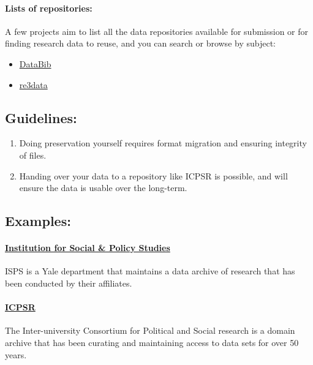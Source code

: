 \documentclass[]{article}
\begin{document}
\paragraph{Lists of repositories:}\label{lists-of-repositories}

A few projects aim to list all the data repositories available for
submission or for finding research data to reuse, and you can search or
browse by subject:  

\begin{itemize}
\itemsep1pt\parskip0pt
\item
\href{http://databib.org/}{DataBib} 
\item
\href{http://www.re3data.org}{re3data}
\end{itemize}

\subsection{Guidelines:}\label{guidelines-2}

\begin{enumerate}
\def\labelenumi{\arabic{enumi}.}
\itemsep1pt\parskip0pt
\item
  Doing preservation yourself requires format migration and ensuring
  integrity of files.
\item
  Handing over your data to a repository like ICPSR is possible, and
  will ensure the data is usable over the long-term.
\end{enumerate}

\subsection{Examples:}\label{examples}

\paragraph{\href{http://isps.yale.edu/research\#.UwJU7IVnCSo}{Institution
for Social \& Policy
Studies}}\label{institution-for-social-policy-studies}

ISPS is a Yale department that maintains a data archive of research that
has been conducted by their affiliates.

\paragraph{\href{http://icpsr.umich.edu}{ICPSR}}\label{icpsr}

The Inter-university Consortium for Political and Social research is a
domain archive that has been curating and maintaining access to data
sets for over 50 years.
\end{document}
